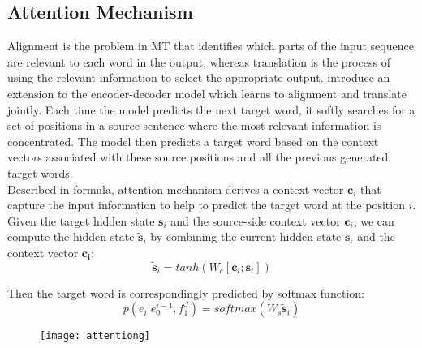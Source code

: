 \subsection{Attention Mechanism}
Alignment is the problem in MT that identifies which parts of the input sequence are relevant to each word in the output, whereas translation is the process of using the relevant information to select the appropriate output.
\cite{bahdanau2014neural} introduce an extension to the encoder-decoder model which learns to alignment and translate jointly. Each time the model predicts the next target word, it softly searches for a set of positions in a source sentence where the most relevant information is concentrated. The model then predicts a target word based on the context vectors associated with these source positions and all the previous generated target words.\\
Described in formula, attention mechanism derives a context vector ${\bm{c}_i}$ that capture the input information to help to predict the target word at the position ${i}$. Given the target hidden state ${\bm{s}_i}$ and the source-side context vector $\bm{c}_i$, we can compute the hidden state ${\tilde{\bm{s}}_i}$ by combining the current hidden state $\bm{s}_i$ and the context vector $\bm{c_i}$:
\[ \tilde{\bm{s}}_i = tanh(W_c[\bm{c}_i; \bm{s}_i])\]

Then the target word is correspondingly predicted by softmax function:
\[  p(e_i|e_0^{i-1}, f_1^J) = softmax(W_s \tilde{\bm{s}}_i)\] 

\begin{figure}
	\centering
	\texttt{[image: attentiong]}
\end{figure}


